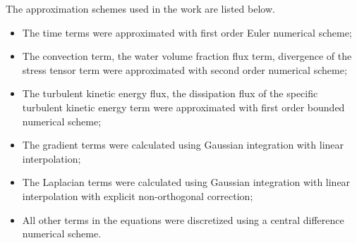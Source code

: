 \documentclass[mathematics,article,accept,pdftex,moreauthors]{Definitions/mdpi}
\begin{document}

The approximation schemes used in the work are listed below.
\begin{itemize}
	\item The time terms were approximated with first order Euler numerical scheme;
	\item The convection term, the water volume fraction flux term, divergence of the stress tensor term were approximated with second order numerical scheme;
	\item The turbulent kinetic energy flux, the dissipation flux of the specific turbulent kinetic energy term were approximated with first order bounded numerical scheme;
	\item The gradient terms were calculated using Gaussian integration with linear interpolation;
	\item The Laplacian terms were calculated using Gaussian integration with linear interpolation with explicit non-orthogonal correction;
	\item All other terms in the equations were discretized using a central difference numerical scheme.
\end{itemize}
\end{document}
